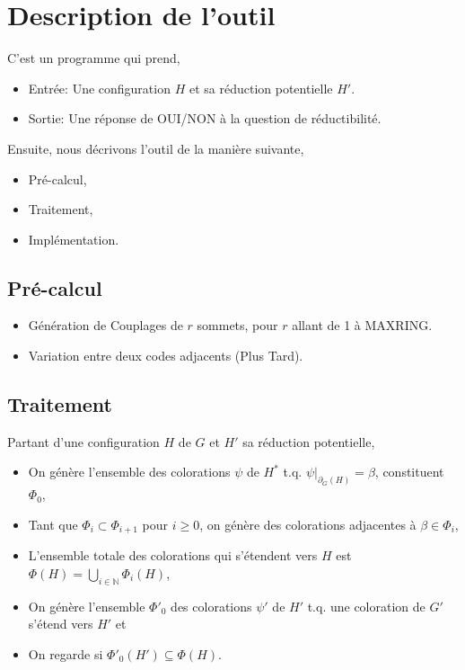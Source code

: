 \documentclass{beamer}
\begin{document}
\section{Description de l'outil}

\begin{frame}
C'est un programme qui prend,
\begin{itemize}
\item Entrée:  Une configuration $H$ et sa réduction potentielle $H'$.
\item Sortie:  Une réponse de OUI/NON à la question de réductibilité.
\end{itemize}
Ensuite, nous décrivons l'outil de la manière suivante,
\begin{itemize}
\item Pré-calcul,
\item Traitement,
\item Implémentation.
\end{itemize} 
\end{frame}

\subsection{Pré-calcul}
\begin{frame}
\begin{itemize}
\item Génération de Couplages de $r$ sommets, pour $r$ allant de 1 à MAXRING.
\item Variation entre deux codes adjacents (Plus Tard).
\end{itemize}
\end{frame}

\subsection{Traitement}

\begin{frame}
Partant d'une configuration $H$ de $G$ et $H'$ sa réduction potentielle,
\begin{itemize}
\item On génère l'ensemble des colorations $\psi$ de $H^*$ t.q. $\psi|_{\partial_G(H)} = \beta$, constituent $\Phi_0$,
\item Tant que $\Phi_i \subset \Phi_{i+1}$ pour $i \geq 0$, on génère des colorations adjacentes à $\beta \in \Phi_i$,
\item L'ensemble totale des colorations qui s'étendent vers $H$ est $\Phi(H) = \bigcup_{i \in \mathbb{N}} \Phi_i(H)$,
\item On génère l'ensemble $\Phi'_0$ des colorations $\psi'$ de $H'$ t.q. une coloration de $G'$ s'étend vers $H'$ et
\item On regarde si $\Phi'_0(H') \subseteq \Phi(H)$.
\end{itemize}
\end{frame}
\end{document}
